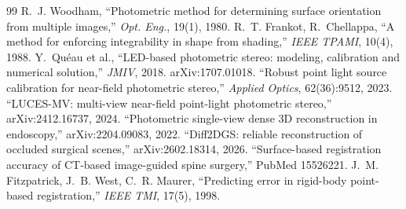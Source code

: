 \documentclass[11pt]{article}
\begin{document}
\begin{thebibliography}{99}\small
{} R.~J. Woodham, ``Photometric method for determining surface
orientation from multiple images,'' \emph{Opt. Eng.}, 19(1), 1980.
 R.~T. Frankot, R.~Chellappa, ``A method for enforcing integrability in
shape from shading,'' \emph{IEEE TPAMI}, 10(4), 1988.
 Y.~Qu\'eau et al., ``LED-based photometric stereo: modeling,
calibration and numerical solution,'' \emph{JMIV}, 2018. arXiv:1707.01018.
 ``Robust point light source calibration for near-field
photometric stereo,'' \emph{Applied Optics}, 62(36):9512, 2023.
 ``LUCES-MV: multi-view near-field point-light photometric stereo,''
arXiv:2412.16737, 2024.
 ``Photometric single-view dense 3D reconstruction in endoscopy,''
arXiv:2204.09083, 2022.
 ``Diff2DGS: reliable reconstruction of occluded surgical scenes,''
arXiv:2602.18314, 2026.
 ``Surface-based registration accuracy of CT-based image-guided spine
surgery,'' PubMed 15526221.
 J.~M. Fitzpatrick, J.~B. West, C.~R. Maurer, ``Predicting error
in rigid-body point-based registration,'' \emph{IEEE TMI}, 17(5), 1998.
\end{thebibliography}
\end{document}

